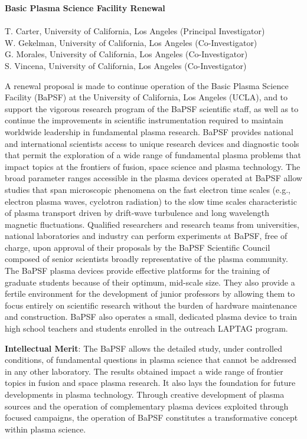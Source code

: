 \documentclass[11pt]{article}
\date{}
\title{}
\begin{document}
%
\begin{center}
{\bfseries Basic Plasma Science Facility Renewal}\\
\hfill \\
T. Carter, University of California, Los Angeles (Principal Investigator)\\
W. Gekelman, University of California, Los Angeles (Co-Investigator)\\
G. Morales, University of California, Los Angeles (Co-Investigator)\\
S. Vincena, University of California, Los Angeles (Co-Investigator)\\
\end{center}

A renewal proposal is made to continue operation of the Basic Plasma
Science Facility (BaPSF) at the University of California, Los Angeles
(UCLA), and to support the vigorous research program of the BaPSF
scientific staff, as well as to continue the improvements in
scientific instrumentation required to maintain worldwide leadership
in fundamental plasma research. BaPSF provides national and
international scientists access to unique research devices and
diagnostic tools that permit the exploration of a wide range of
fundamental plasma problems that impact topics at the frontiers of
fusion, space science and plasma technology. The broad parameter
ranges accessible in the plasma devices operated at BaPSF allow
studies that span microscopic phenomena on the fast electron time
scales (e.g., electron plasma waves, cyclotron radiation) to the slow
time scales characteristic of plasma transport driven by drift-wave
turbulence and long wavelength magnetic fluctuations.  Qualified
researchers and research teams from universities, national
laboratories and industry can perform experiments at BaPSF, free of
charge, upon approval of their proposals by the BaPSF Scientific
Council composed of senior scientists broadly representative of the
plasma community. The BaPSF plasma devices provide effective platforms
for the training of graduate students because of their optimum,
mid-scale size. They also provide a fertile environment for the
development of junior professors by allowing them to focus entirely on
scientific research without the burden of hardware maintenance and
construction. BaPSF also operates a small, dedicated plasma device to
train high school teachers and students enrolled in the outreach
LAPTAG program.  

{\bfseries Intellectual Merit}:  The BaPSF allows the detailed
study, under controlled conditions, of fundamental questions in plasma
science that cannot be addressed in any other laboratory. The results
obtained impact a wide range of frontier topics in fusion and space
plasma research. It also lays the foundation for future developments
in plasma technology. Through creative development of plasma sources
and the operation of complementary plasma devices exploited through
focused campaigns, the operation of BaPSF constitutes a transformative
concept within plasma science.  
\end{document}
